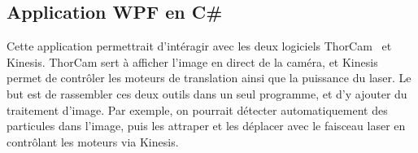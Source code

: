 \subsection{Application WPF en C\#}

Cette application permettrait d'intéragir avec les deux logiciels ThorCam~\cite{thorcamSoftware} et Kinesis. ThorCam sert à afficher l'image en direct de la caméra, et Kinesis permet de contrôler les moteurs de translation ainsi que la puissance du laser. Le but est de rassembler ces deux outils dans un seul programme, et d'y ajouter du traitement d'image. Par exemple, on pourrait détecter automatiquement des particules dans l'image, puis les attraper et les déplacer avec le faisceau laser en contrôlant les moteurs via Kinesis.




